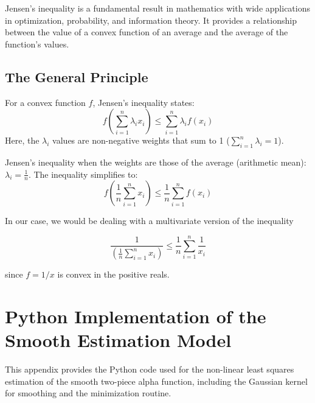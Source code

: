 \documentclass[12pt]{article}
\begin{document}
Jensen's inequality is a fundamental result in mathematics with wide applications in optimization, probability, and information theory. It provides a relationship between the value of a convex function of an average and the average of the function's values.

\subsection{The General Principle}
For a convex function $f$, Jensen's inequality states:
$$ f\left(\sum_{i=1}^n \lambda_i x_i\right) \le \sum_{i=1}^n \lambda_i f(x_i) $$
Here, the $\lambda_i$ values are non-negative weights that sum to 1 ($\sum_{i=1}^n \lambda_i = 1$).


Jensen's inequality when the weights are those of the average (arithmetic mean): $\lambda_i = \frac{1}{n}$. The inequality simplifies to:
$$ f\left(\frac{1}{n}\sum_{i=1}^n x_i\right) \le \frac{1}{n}\sum_{i=1}^n f(x_i) $$

In our case, we would be dealing with a multivariate version of the inequality 

$$ \frac{1}{\left(\frac{1}{n}\sum_{i=1}^n x_i\right)} \le \frac{1}{n}\sum_{i=1}^n \frac{1}{x_i} $$

since $f=1/x$ is convex in the positive reals.

\appendix
\section{Python Implementation of the Smooth Estimation Model}
\label{sec:python-implementation}

This appendix provides the Python code used for the non-linear least squares estimation of the smooth two-piece alpha function, including the Gaussian kernel for smoothing and the minimization routine.
\end{document}
